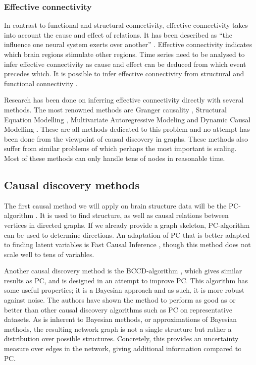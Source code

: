 \documentclass[a4paper, 10pt, english, twocolumn]{article}
\begin{document}
\subsubsection*{Effective connectivity}
In contrast to functional and structural connectivity, effective connectivity takes into account the cause and effect of relations.
It has been described as ``the influence one neural system exerts over another'' \cite{friston1994}.
Effective connectivity indicates which brain regions stimulate other regions.
Time series need to be analysed to infer effective connectivity as cause and effect can be deduced from which event precedes which. 
It is possible to infer effective connectivity from structural and functional connectivity \cite{mclntosh1994, harrison2003, friston2003, roebroeck2005}.

Research has been done on inferring effective connectivity directly with several methods.
The most renowned methods are Granger causality \cite{roebroeck2005}, Structural Equation Modelling \cite{mclntosh1994}, Multivariate Autoregressive Modeling \cite{harrison2003} and Dynamic Causal Modelling \cite{friston2003}.
These are all methods dedicated to this problem and no attempt has been done from the viewpoint of causal discovery in graphs.
These methods also suffer from similar problems of which perhaps the most important is scaling.
Most of these methods can only handle tens of nodes in reasonable time.

\subsection*{Causal discovery methods}
The first causal method we will apply on brain structure data will be the PC-algorithm \cite{spirtes2000}.
It is used to find structure, as well as causal relations between vertices in directed graphs. 
If we already provide a graph skeleton, PC-algorithm can be used to determine directions.
An adaptation of PC that is better adapted to finding latent variables is Fast Causal Inference \cite{spirtes2000}, though this method does not scale well to tens of variables.

Another causal discovery method is the BCCD-algorithm \cite{claassen2012}, which gives similar results as PC, and is designed in an attempt to improve PC.
This algorithm has some useful properties; it is a Bayesian approach and as such, it is more robust against noise.
The authors have shown the method to perform as good as or better than other causal discovery algorithms such as PC on representative datasets.
As is inherent to Bayesian methods, or approximations of Bayesian methods, the resulting network graph is not a  single structure but rather a distribution over possible structures.
Concretely, this provides an uncertainty measure over edges in the network, giving additional information compared to PC.
\end{document}
